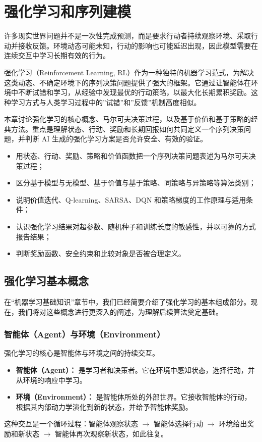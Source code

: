 ﻿\chapter{强化学习和序列建模}

许多现实世界问题并不是一次性完成预测，而是要求行动者持续观察环境、采取行动并接收反馈。环境动态可能未知，行动的影响也可能延迟出现，因此模型需要在连续交互中学习长期有效的行为。

强化学习（Reinforcement Learning, RL）作为一种独特的机器学习范式，为解决这类动态、不确定环境下的序列决策问题提供了强大的框架。它通过让智能体在环境中不断试错和学习，从经验中发现最优的行动策略，以最大化长期累积奖励。这种学习方式与人类学习过程中的”试错”和”反馈”机制高度相似。

本章讨论强化学习的核心概念、马尔可夫决策过程，以及基于价值和基于策略的经典方法。重点是理解状态、行动、奖励和长期回报如何共同定义一个序列决策问题，并判断 AI 生成的强化学习方案是否允许安全、有效的验证。

\begin{chapterguide}
\begin{itemize}
  \item 用状态、行动、奖励、策略和价值函数把一个序列决策问题表述为马尔可夫决策过程；
  \item 区分基于模型与无模型、基于价值与基于策略、同策略与异策略等算法类别；
  \item 说明价值迭代、Q-learning、SARSA、DQN 和策略梯度的工作原理与适用条件；
  \item 认识强化学习结果对超参数、随机种子和训练长度的敏感性，并以可靠的方式报告结果；
  \item 判断奖励函数、安全约束和比较对象是否被合理定义。
\end{itemize}
\end{chapterguide}

\section{强化学习基本概念}
在“机器学习基础知识”章节中，我们已经简要介绍了强化学习的基本组成部分。现在，我们将对这些概念进行更深入的阐述，为理解后续算法奠定基础。

\subsection{智能体（Agent）与环境（Environment）}
强化学习的核心是智能体与环境之间的持续交互。
\begin{itemize}
    \item \textbf{智能体（Agent）：} 是学习者和决策者。它在环境中感知状态，选择行动，并从环境的响应中学习。
    \item \textbf{环境（Environment）：} 是智能体所处的外部世界。它接收智能体的行动，根据其内部动力学演化到新的状态，并给予智能体奖励。
\end{itemize}
这种交互是一个循环过程：智能体观察状态 $\to$ 智能体选择行动 $\to$ 环境给出奖励和新状态 $\to$ 智能体再次观察新状态，如此往复。

